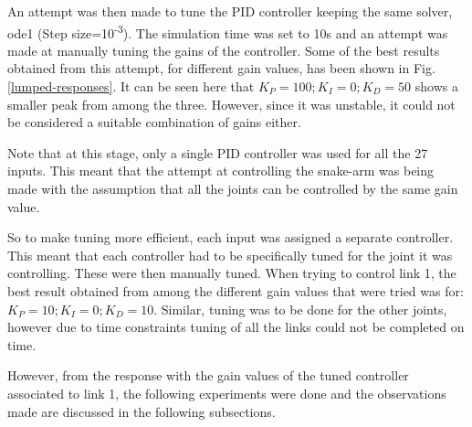 \documentclass[a4paper,12pt]{report}
\begin{document}
An attempt was then made to tune the PID controller keeping the same solver, ode1 (Step size=10\textsuperscript{-3}). The simulation time was set to 10s and an attempt was made at manually tuning the gains of the controller. Some of the best results obtained from this attempt, for different gain values, has been shown in Fig. \ref{lumped-responses}. It can be seen here that $ K_P=100;K_I=0;K_D=50 $ shows a smaller peak from among the three. However, since it was unstable, it could not be considered a suitable combination of gains either.

Note that at this stage, only a single PID controller was used for all the 27 inputs. This meant that the attempt at controlling the snake-arm was being made with the assumption that all the joints can be controlled by the same gain value.  

So to make tuning more efficient, each input was assigned a separate controller. This meant that each controller had to be specifically tuned for the joint it was controlling. These were then manually tuned. When trying to control link 1, the best result obtained from among the different gain values that were tried was for: $ K_P=10;K_I=0;K_D=10 $. Similar, tuning was to be done for the other joints, however due to time constraints tuning of all the links could not be completed on time.

However, from the response with the gain values of the tuned controller associated to link 1, the following experiments were done and the observations made are discussed in the following subsections.
\end{document}
